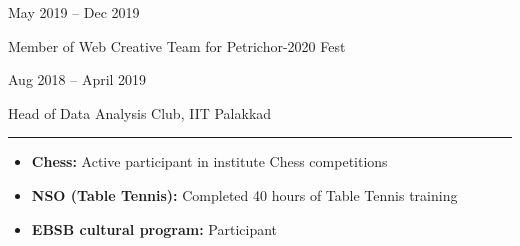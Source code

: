 \documentclass[a4paper,10pt]{article}
\newlength{\cvcolumngapwidth}
\newlength{\cvleftcolumnwidth}
\newlength{\cvrightcolumnwidth}
\newcommand{\cvsectionstyle}[1]{{\normalsize\cvsectionfont\textcolor{cvsectioncolor}{#1}}}
\newcommand{\cvtitlestyle}[1]{{\large\cvtitlefont\textcolor{cvtitlecolor}{#1}}}
\newcommand{\cvdurationstyle}[1]{{\small\cvdurationfont\textcolor{cvdurationcolor}{#1}}}
\newcommand{\cvheadingstyle}[1]{{\normalsize\cvheadingfont\textcolor{cvheadingcolor}{#1}}}
\newlength{\cvafteritemskipamount}
\newlength{\cvaftersectionskipamount}
\newlength{\cvbetweensectionandheadingextraskipamount}
\newlength{\cvaftertitleskipamount}
\newlength{\cvparskip}
\newcommand{\cvsection}[1]{
    \begin{minipage}[t]{\cvleftcolumnwidth}
        \raggedleft\cvsectionstyle{#1}
    \end{minipage}%
    \hspace{\cvcolumngapwidth}%
    \begin{minipage}[t]{\cvrightcolumnwidth}
        \textcolor{cvrulecolor}{\rule{\cvrightcolumnwidth}{0.3mm}}
    \end{minipage}

    \vspace{\cvaftersectionskipamount}
}
\newcommand{\cvitem}[2]{
    \begin{minipage}[t]{\cvleftcolumnwidth}
        \raggedleft #1
    \end{minipage}%
    \hspace{\cvcolumngapwidth}%
    \begin{minipage}[t]{\cvrightcolumnwidth}
        \setlength{\parskip}{\cvparskip} #2
    \end{minipage}

    \vspace{\cvafteritemskipamount}
}
\newcommand{\cvtitle}[1]{
    \cvtitlestyle{#1}

    \vspace{\cvaftertitleskipamount}
    \vspace{-\cvparskip}
}
\begin{document}
\cvitem{
    \cvdurationstyle{May 2019 -- Dec 2019}
}{
    \cvtitle{Member of Web Creative Team for Petrichor-2020 Fest}
}

\cvitem{
    \cvdurationstyle{Aug 2018 -- April 2019}
}{
    \cvtitle{Head of Data Analysis Club, IIT Palakkad}
}


\cvsection{EXTRACURRICULAR ACTIVITIES}

\vspace{\cvbetweensectionandheadingextraskipamount}

\cvitem{
    \cvheadingstyle{}
}{
    
    \begin{itemize}
        \item \textbf{Chess:} Active participant in institute Chess competitions
        \item \textbf{NSO (Table Tennis):} Completed 40 hours of Table Tennis training
        \item \textbf{EBSB cultural program:} Participant
        
    \end{itemize}

    
}
\end{document}
